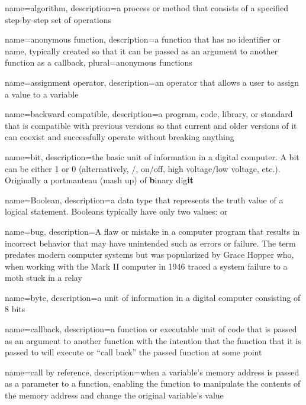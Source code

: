 
{
  name=algorithm,
  description={a process or method that consists of a specified step-by-step set of operations}
}

{
  name=anonymous function,
  description={a function that has no identifier or name, typically created so that it can be passed as an argument to another function as a callback},
  plural=anonymous functions
}

{
  name=assignment operator,
  description={an operator that allows a user to assign a value to a variable}
}

{
  name=backward compatible,
  description={a program, code, library, or standard that is compatible with previous versions so that current
  	and older versions of it can coexist and successfully operate without breaking anything}
}

{
  name=bit,
  description={the basic unit of information in a digital computer.  A bit can be either 1 or 0 (alternatively, \True/\False, 
  	on/off, high voltage/low voltage, etc.).  Originally a portmanteau (mash up) of \textbf{b}inary dig\textbf{it}}
}

{
  name=Boolean,
  description={a data type that represents the truth value of a logical statement.  Booleans typically have only two 
  	values: \True or \False}
}

{
  name=bug,
  description={A flaw or mistake in a computer program that results in incorrect behavior that may have unintended such as errors or failure.  The
  	term predates modern computer systems but was popularized by Grace Hopper who, when working with the Mark II computer in 1946 traced
  	a system failure to a moth stuck in a relay}
}

{
  name=byte,
  description={a unit of information in a digital computer consisting of 8 bits}
}

{
  name=callback,
  description={a function or executable unit of code that is passed as an argument to another function with the intention that the function that it is passed to will execute or ``call back'' the passed function at some point}
}

{
  name=call by reference,
  description={when a variable's memory address is passed as a parameter to a function, enabling the function to manipulate the contents of the memory address and change the original variable's value}
}

